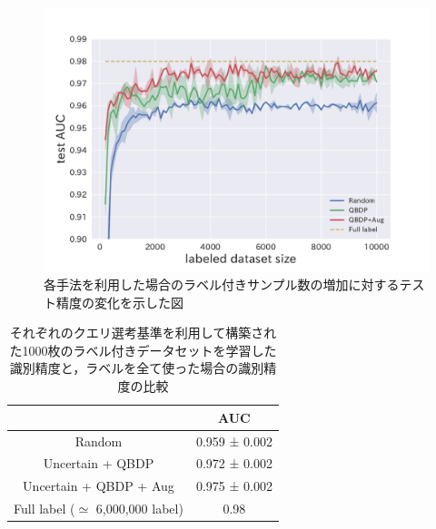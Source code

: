 \begin{figure}[tbp]
     \begin{center}
      \includegraphics[width=12cm]{figures/camelyon_acc_graph.pdf}
     \end{center}
    \caption{\label{fig:camelyon_acc_graph}各手法を利用した場合のラベル付きサンプル数の増加に対するテスト精度の変化を示した図}
\end{figure}

\begin{table}[h]
  \caption{\label{table:camelyon_last_accuracy}それぞれのクエリ選考基準を利用して構築された1000枚のラベル付きデータセットを学習した識別精度と，ラベルを全て使った場合の識別精度の比較}
  \center
  \begin{tabular}{c|c} 
       &  AUC \\ \hline
      Random & 0.959 ± 0.002  \\
      Uncertain + QBDP & 0.972 ± 0.002  \\ 
      Uncertain + QBDP + Aug & 0.975 ± 0.002  \\ \hline
      Full label ($\simeq$ 6,000,000 label) & 0.98
  \end{tabular}
\end{table}

